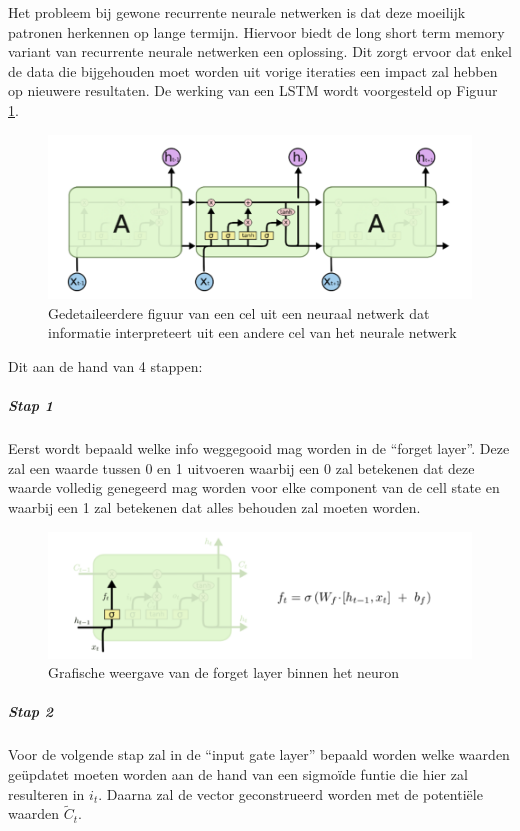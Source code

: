 Het probleem bij gewone recurrente neurale netwerken is dat deze moeilijk patronen herkennen op lange termijn. Hiervoor biedt de long short term memory variant van recurrente neurale netwerken een oplossing. Dit zorgt ervoor dat enkel de data die bijgehouden moet worden uit vorige iteraties een impact zal hebben op nieuwere resultaten. De werking van een LSTM wordt voorgesteld op Figuur \ref{fig:lstmfig2}.

\begin{figure}[!h]
    \centering
    \caption{Gedetaileerdere figuur van een cel uit een neuraal netwerk dat informatie interpreteert uit een andere cel van het neurale netwerk~\autocite{Olah2015}}
    \label{fig:lstmfig2}
    \includegraphics[width=0.7\linewidth]{lstmFig2}
\end{figure}


Dit aan de hand van 4 stappen:
\subparagraph{Stap 1}
Eerst wordt bepaald welke info weggegooid mag worden in de ``forget layer''.
Deze zal een waarde tussen 0 en 1 uitvoeren waarbij een 0 zal betekenen dat deze waarde volledig genegeerd mag worden voor elke component van de cell state en waarbij een 1 zal betekenen dat alles behouden zal moeten worden. 

\begin{figure}
    \centering
    \caption{Grafische weergave van de forget layer binnen het neuron~\autocite{Olah2015}}
    \label{fig:lstmfig3}
    \includegraphics[width=0.7\linewidth]{lstmFig3}
\end{figure}


\subparagraph{Stap 2}
Voor de volgende stap zal in de ``input gate layer'' bepaald worden welke waarden ge\"{u}pdatet moeten worden aan de hand van een sigmo\"{i}de funtie die hier zal resulteren in $i_t$. Daarna zal de vector geconstrueerd worden met de potenti\"{e}le waarden $\tilde{C}_t$.

